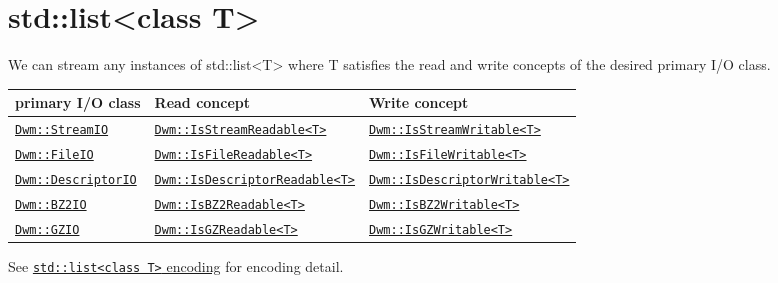 \begin{minipage}{\textwidth}
\section{\ttfamily std::list<class T>}
We can stream any instances of {\ttfamily std::list<T>} where
{\ttfamily T} satisfies the read and write concepts of the desired
primary I/O class.
\vspace{1ex}

\begin{tabular}{lll}
  \textbf{primary I/O class} & \textbf{Read concept} & \textbf{Write concept} \\ \hline
  \hyperref[section:DwmStreamIOClass]{\texttt{Dwm::StreamIO}} & \hyperref[concept:DwmIsStreamReadable]{\texttt{Dwm::IsStreamReadable<T>}} & \hyperref[concept:DwmIsStreamWritable]{\texttt{Dwm::IsStreamWritable<T>}} \\
  \hyperref[section:DwmFileIOClass]{\texttt{Dwm::FileIO}} & \hyperref[concept:DwmIsFileReadable]{\texttt{Dwm::IsFileReadable<T>}} & \hyperref[concept:DwmIsFileWritable]{\texttt{Dwm::IsFileWritable<T>}} \\
  \hyperref[section:DwmDescriptorIOClass]{\texttt{Dwm::DescriptorIO}} & \hyperref[concept:DwmIsDescriptorReadable]{\texttt{Dwm::IsDescriptorReadable<T>}} & \hyperref[concept:DwmIsDescriptorWritable]{\texttt{Dwm::IsDescriptorWritable<T>}} \\
  \hyperref[section:DwmBZ2IOClass]{\texttt{Dwm::BZ2IO}} & \hyperref[concept:DwmIsBZ2Readable]{\texttt{Dwm::IsBZ2Readable<T>}} & \hyperref[concept:DwmIsBZ2Writable]{\texttt{Dwm::IsBZ2Writable<T>}} \\
  \hyperref[section:DwmGZIOClass]{\texttt{Dwm::GZIO}} & \hyperref[concept:DwmIsGZReadable]{\texttt{Dwm::IsGZReadable<T>}} & \hyperref[concept:DwmIsGZWritable]{\texttt{Dwm::IsGZWritable<T>}} \\
\end{tabular}
\vspace{1ex}

See \hyperref[encoding:stdList]{\texttt{std::list<class T>} encoding} for
encoding detail.
\end{minipage}

